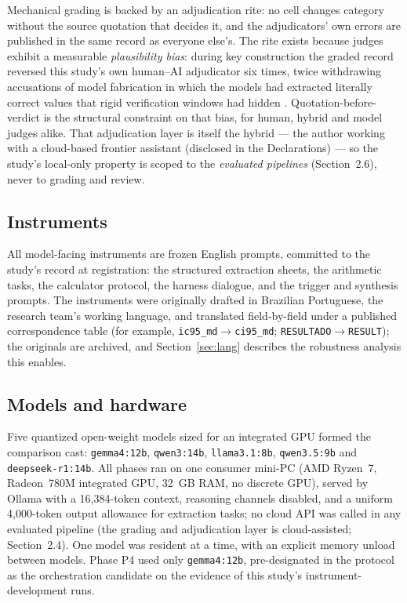 \documentclass[11pt]{article}
\begin{document}
Mechanical grading is backed by an adjudication rite: no cell changes category without the source quotation that decides it, and the adjudicators' own errors are published in the same record as everyone else's. The rite exists because judges exhibit a measurable \emph{plausibility bias}: during key construction the graded record reversed this study's own human--AI adjudicator six times, twice withdrawing accusations of model fabrication in which the models had extracted literally correct values that rigid verification windows had hidden \citep{barra2026extrai}. Quotation-before-verdict is the structural constraint on that bias, for human, hybrid and model judges alike. That adjudication layer is itself the hybrid --- the author working with a cloud-based frontier assistant (disclosed in the Declarations) --- so the study's local-only property is scoped to the \emph{evaluated pipelines} (Section~2.6), never to grading and review.

\subsection{Instruments}
All model-facing instruments are frozen English prompts, committed to the study's record at registration: the structured extraction sheets, the arithmetic tasks, the calculator protocol, the harness dialogue, and the trigger and synthesis prompts. The instruments were originally drafted in Brazilian Portuguese, the research team's working language, and translated field-by-field under a published correspondence table (for example, \texttt{ic95\_md}$\rightarrow$\texttt{ci95\_md}; \texttt{RESULTADO}$\rightarrow$\texttt{RESULT}); the originals are archived, and Section~\ref{sec:lang} describes the robustness analysis this enables.

\subsection{Models and hardware}
Five quantized open-weight models sized for an integrated GPU formed the comparison cast: \texttt{gemma4:12b}, \texttt{qwen3:14b}, \texttt{llama3.1:8b}, \texttt{qwen3.5:9b} and \texttt{deepseek-r1:14b}. All phases ran on one consumer mini-PC (AMD Ryzen~7, Radeon~780M integrated GPU, 32~GB RAM, no discrete GPU), served by Ollama with a 16{,}384-token context, reasoning channels disabled, and a uniform 4{,}000-token output allowance for extraction tasks; no cloud API was called in any evaluated pipeline (the grading and adjudication layer is cloud-assisted; Section~2.4). One model was resident at a time, with an explicit memory unload between models. Phase P4 used only \texttt{gemma4:12b}, pre-designated in the protocol as the orchestration candidate on the evidence of this study's instrument-development runs.
\end{document}

